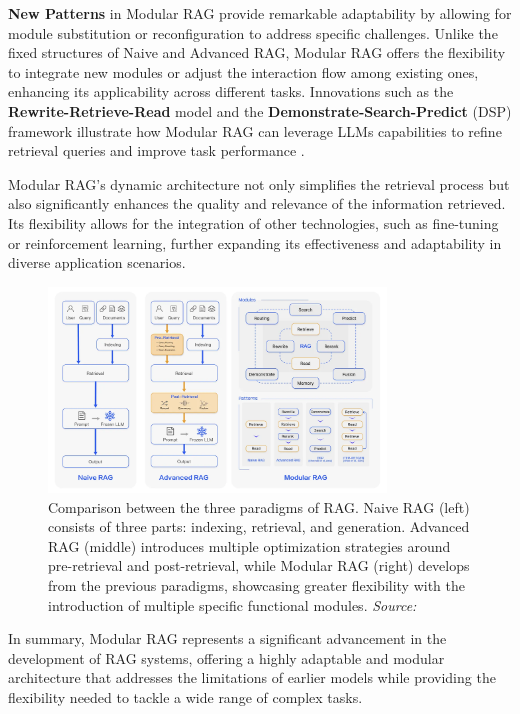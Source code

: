 \textbf{New Patterns} in Modular RAG provide remarkable adaptability by allowing for module substitution or reconfiguration to address specific challenges. Unlike the fixed structures of Naive and Advanced RAG, Modular RAG offers the flexibility to integrate new modules or adjust the interaction flow among existing ones, enhancing its applicability across different tasks. Innovations such as the \textbf{Rewrite-Retrieve-Read} model and the \textbf{Demonstrate-Search-Predict} (DSP) framework illustrate how Modular RAG can leverage LLMs capabilities to refine retrieval queries and improve task performance \cite{khattab2022demonstrate}.

Modular RAG’s dynamic architecture not only simplifies the retrieval process but also significantly enhances the quality and relevance of the information retrieved. Its flexibility allows for the integration of other technologies, such as fine-tuning or reinforcement learning, further expanding its effectiveness and adaptability in diverse application scenarios.

\begin{figure}[h]
    \centering
    \includegraphics[width=0.8\textwidth]{images/llms/naive-adv-modular-rag.png}
    \caption{Comparison between the three paradigms of RAG. Naive RAG (left) consists of three parts: indexing, retrieval, and generation. Advanced RAG (middle) introduces multiple optimization strategies around pre-retrieval and post-retrieval, while Modular RAG (right) develops from the previous paradigms, showcasing greater flexibility with the introduction of multiple specific functional modules. \textit{Source:} \cite{gao2023retrieval}}
    \label{fig:rag_paradigms}
\end{figure}

In summary, Modular RAG represents a significant advancement in the development of RAG systems, offering a highly adaptable and modular architecture that addresses the limitations of earlier models while providing the flexibility needed to tackle a wide range of complex tasks.

